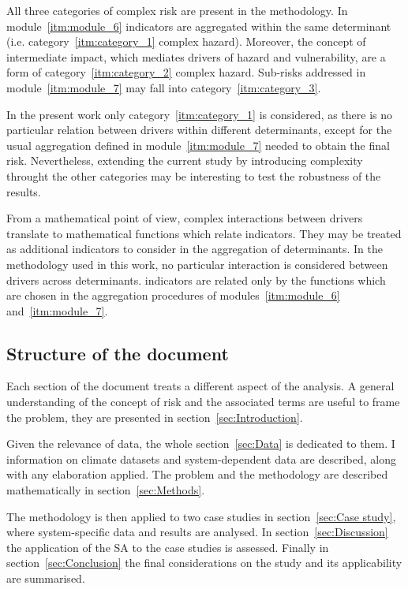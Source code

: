 All three categories of complex \gls{risk} are present in the methodology. In module~\ref{itm:module_6} \glspl{indicator} are aggregated within the same \gls{determinant} (i.e. category~\ref{itm:category_1} complex \gls{hazard}). Moreover, the concept of intermediate impact, which mediates \glspl{driver} of \gls{hazard} and \gls{vulnerability}, are a form of category~\ref{itm:category_2} complex \gls{hazard}.\cite[33]{2017GIZRiskSupplement} Sub-risks addressed in module~\ref{itm:module_7} may fall into category~\ref{itm:category_3}.

In the present work only category~\ref{itm:category_1} is considered, as there is no particular relation between \glspl{driver} within different \glspl{determinant}, except for the usual aggregation defined in module~\ref{itm:module_7} needed to obtain the final \gls{risk}. Nevertheless, extending the current study by introducing complexity throught the other categories may be interesting to test the robustness of the results.

From a mathematical point of view, complex interactions between \glspl{driver} translate to mathematical functions which relate \glspl{indicator}. They may be treated as additional \glspl{indicator} to consider in the aggregation of \glspl{determinant}.\cite[39-40]{2008OECDHandbookOn}
In the methodology used in this work, no particular interaction is considered between \glspl{driver} across \glspl{determinant}. \Glspl{indicator} are related only by the functions which are chosen in the aggregation procedures of modules~\ref{itm:module_6} and~\ref{itm:module_7}.



\subsection{Structure of the document}
Each section of the document treats a different aspect of the analysis. A general understanding of the concept of \gls{risk} and the associated terms are useful to frame the problem, they are presented in section~\ref{sec:Introduction}.

Given the relevance of data, the whole section~\ref{sec:Data} is dedicated to them. I information on climate datasets and system-dependent data are described, along with any elaboration applied. The problem and the methodology are described mathematically in section~\ref{sec:Methods}.

The methodology is then applied to two case studies in section~\ref{sec:Case study}, where system-specific data and results are analysed. In section~\ref{sec:Discussion} the application of the \gls{SA} to the case studies is assessed. Finally in section~\ref{sec:Conclusion} the final considerations on the study and its applicability are summarised.
